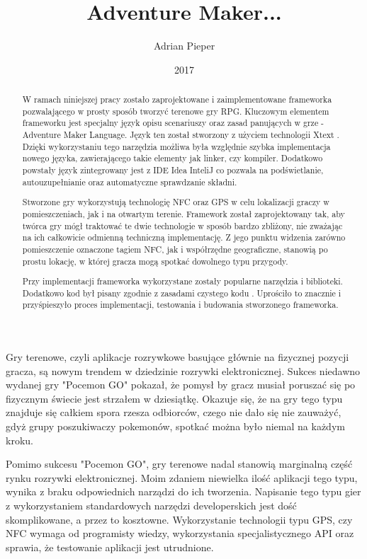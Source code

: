 \documentclass	{xmgr}
\author   {Adrian Pieper}
\title    {Adventure Maker...}
\date     {2017}
\begin{document}
\begin{abstract}
  W ramach niniejszej pracy zostało zaprojektowane i zaimplementowane frameworka pozwalającego w prosty sposób tworzyć terenowe gry RPG. Kluczowym elementem frameworku jest specjalny język opisu scenariuszy oraz zasad panujących w grze - Adventure Maker Language. Język ten został stworzony z użyciem technologii Xtext \cite{Xtext:2017:Doc}. Dzięki wykorzystaniu tego narzędzia możliwa była względnie szybka implementacja nowego języka, zawierającego takie elementy jak linker, czy kompiler. Dodatkowo powstały język zintegrowany jest z IDE Idea InteliJ co pozwala na podświetlanie, autouzupełnianie oraz automatyczne sprawdzanie składni.
  
  Stworzone gry wykorzystują technologię NFC oraz GPS w celu lokalizacji graczy w pomieszczeniach, jak i na otwartym terenie. Framework został zaprojektowany tak, aby twórca gry mógł traktować te dwie technologie w sposób bardzo zbliżony, nie zważając na ich  całkowicie odmienną techniczną implementację. Z jego punktu widzenia zarówno pomieszczenie oznaczone tagiem NFC, jak i współrzędne geograficzne, stanowią po prostu lokację, w której gracza mogą spotkać dowolnego typu przygody. 
  
  Przy implementacji frameworka wykorzystane zostały popularne narzędzia i biblioteki. Dodatkowo kod był pisany zgodnie z zasadami czystego kodu \cite{CleanCode:2005}. Uprościło to znacznie i przyśpieszyło proces implementacji, testowania i budowania stworzonego frameworka.
\end{abstract}


\maketitle

\introduction

Gry terenowe, czyli aplikacje rozrywkowe basujące głównie na fizycznej pozycji gracza, są nowym trendem w dziedzinie rozrywki elektronicznej. Sukces niedawno wydanej gry "Pocemon GO" pokazał, że pomysł by gracz musiał poruszać się po fizycznym świecie jest strzałem w dziesiątkę. Okazuje się, że na gry tego typu znajduje się całkiem spora rzesza odbiorców, czego nie dało się nie zauważyć, gdyż grupy poszukiwaczy pokemonów, spotkać można było niemal na każdym kroku.

Pomimo sukcesu "Pocemon GO", gry terenowe nadal stanowią marginalną część rynku rozrywki elektronicznej. Moim zdaniem niewielka ilość aplikacji tego typu, wynika z braku odpowiednich narządzi do ich tworzenia. Napisanie tego typu gier z wykorzystaniem standardowych narzędzi developerskich jest dość skomplikowane, a przez to kosztowne. Wykorzystanie technologii typu GPS, czy NFC wymaga od programisty wiedzy, wykorzystania specjalistycznego API oraz sprawia, że testowanie aplikacji jest utrudnione.
\end{document}
